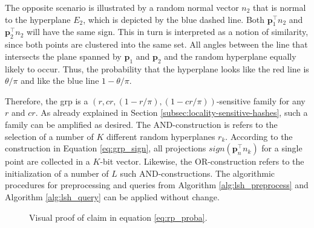 \documentclass[../../../main.tex]{subfiles}
\begin{document}
The opposite scenario is illustrated by a random normal vector $n_2$ that is normal to the hyperplane $E_2$, which is depicted by the blue dashed line. Both $\bm{p}_1^\top n_2$ and  $\bm{p}_2^\top n_2$ will have the same sign. This in turn is interpreted as a notion of similarity, since both points are clustered into the same set. All angles between the line that intersects the plane spanned by $\bm{p}_1$ and $\bm{p}_2$ and the random hyperplane equally likely to occur. Thus, the probability that the hyperplane looks like the red line is $\theta / \pi$ and like the blue line $1 - \theta / \pi$.

Therefore, the \gls{grp} is a $(r, cr, (1-r/\pi), (1-cr/\pi))$-sensitive family for any $r$ and $cr$. As already explained in Section \ref{subsec:locality-sensitive-hashes}, such a family can be amplified as desired. The AND-construction is refers to the selection of a number of $K$ different random hyperplanes $r_k$. According to the construction in Equation \ref{eq:grp_sign}, all projections $sign(\bm{p}_n^\top n_k)$ for a single point are collected in a $K$-bit vector. Likewise, the OR-construction refers to the initialization of a number of $L$ such AND-constructions. The algorithmic procedures for preprocessing and queries from Algorithm \ref{alg:lsh_preprocess} and Algorithm \ref{alg:lsh_query} can be applied without change. 

\begin{figure}[t]
    \centering
    
    \caption[Visual proof of assignment probability in a \gls{grp}]{Visual proof of claim in equation \ref{eq:rp_proba}.}
    \label{fig:rp_2d}
\end{figure}
\end{document}
